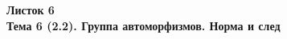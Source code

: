 \documentclass[a4paper, 11pt]{article}
\begin{document}
\begin{center} \Large \bf Листок 6\\ Тема 6 (2.2). Группа автоморфизмов. Норма и след \end{center}


\end{document}
